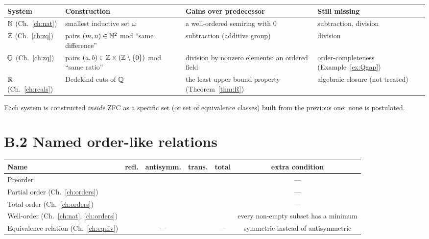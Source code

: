 \begin{center}
\begin{tabular}{@{}lp{3.6cm}p{3.5cm}p{3.9cm}@{}}
	\toprule
	\textbf{System} & \textbf{Construction} & \textbf{Gains over predecessor} & \textbf{Still missing}\\
	\midrule
	$\mathbb{N}$ (Ch.~\ref{ch:nat}) & smallest inductive set $\omega$ & a well-ordered semiring with $0$ & subtraction, division\\
	$\mathbb{Z}$ (Ch.~\ref{ch:zq}) & pairs $(m,n)\in\mathbb{N}^2$ mod ``same difference'' & subtraction (additive group) & division\\
	$\mathbb{Q}$ (Ch.~\ref{ch:zq}) & pairs $(a,b)\in\mathbb{Z}\times(\mathbb{Z}\setminus\{0\})$ mod ``same ratio'' & division by nonzero elements: an ordered field & order-completeness (Example~\ref{ex:Qgap})\\
	$\mathbb{R}$ (Ch.~\ref{ch:reals}) & Dedekind cuts of $\mathbb{Q}$ & the least upper bound property (Theorem~\ref{thm:R}) & algebraic closure (not treated)\\
	\bottomrule
\end{tabular}
\end{center}

Each system is constructed \emph{inside} ZFC as a specific set (or set of equivalence classes) built from the previous one; none is postulated.

\section*{B.2 Named order-like relations}

\begin{center}
\begin{tabular}{@{}lccccc@{}}
	\toprule
	\textbf{Name} & refl. & antisymm. & trans. & total & extra condition\\
	\midrule
	Preorder & \checkmark & & \checkmark & & ---\\
	Partial order (Ch.~\ref{ch:orders}) & \checkmark & \checkmark & \checkmark & & ---\\
	Total order (Ch.~\ref{ch:orders}) & \checkmark & \checkmark & \checkmark & \checkmark & ---\\
	Well-order (Ch.~\ref{ch:nat}, \ref{ch:orders}) & \checkmark & \checkmark & \checkmark & \checkmark & every non-empty subset has a minimum\\
	Equivalence relation (Ch.~\ref{ch:equiv}) & \checkmark & --- & \checkmark & --- & symmetric instead of antisymmetric\\
	\bottomrule
\end{tabular}
\end{center}

